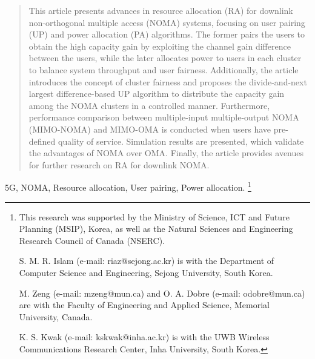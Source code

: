 \documentclass[10pt,final,journal,a4paper,twoside,twocolumn,romanappendices]{IEEEtran}
\theoremstyle{myremark}
\theoremstyle{myremark}
\begin{document}




\maketitle



\begin{abstract}
This article presents advances in resource allocation (RA) for downlink non-orthogonal multiple access (NOMA) systems, focusing on user pairing (UP) and power allocation (PA) algorithms. The former pairs the users to obtain the high capacity gain by exploiting the channel gain difference between the users, while the later allocates power to users in each cluster to balance system throughput and user fairness. Additionally, the article introduces the concept of cluster fairness and proposes the divide-and-next largest difference-based UP algorithm to distribute the capacity gain among the NOMA clusters in a controlled manner. Furthermore, {\color{black}performance comparison between multiple-input multiple-output NOMA (MIMO-NOMA) and MIMO-OMA is conducted when users have pre-defined quality of service. Simulation results are presented, which validate the advantages of NOMA over OMA.} Finally, the article provides avenues for further research on RA for downlink NOMA.
\end{abstract}

\begin{IEEEkeywords}
5G, NOMA, Resource allocation, User pairing, Power allocation.
{\let\thefootnote\relax\footnote{This research was supported by the Ministry of Science, ICT and Future Planning (MSIP), Korea, as well as the Natural Sciences and Engineering Research Council of Canada (NSERC). 

S. M. R. Islam (e-mail: riaz@sejong.ac.kr) is with the Department of Computer Science and Engineering, Sejong University, South Korea.

M. Zeng (e-mail: mzeng@mun.ca) and O. A. Dobre (e-mail: odobre@mun.ca) are with the Faculty of Engineering and Applied Science, Memorial University, Canada.

K. S. Kwak (e-mail: kskwak@inha.ac.kr) is with the UWB Wireless Communications Research Center, Inha University, South Korea.
}  }
\end{IEEEkeywords}
\end{document}

